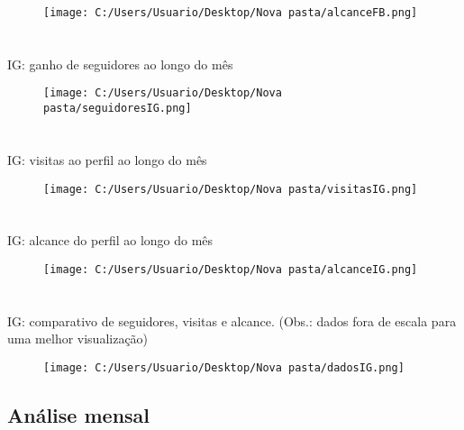 \documentclass{article}%
\begin{document}
\begin{figure}[H]%
\centering%
\texttt{[image: C:/Users/Usuario/Desktop/Nova pasta/alcanceFB.png]}%
\end{figure}

%
\section*{}%
\label{sec:}%
IG: ganho de seguidores ao longo do mês%


\begin{figure}[H]%
\centering%
\texttt{[image: C:/Users/Usuario/Desktop/Nova pasta/seguidoresIG.png]}%
\end{figure}

%
\section*{}%
\label{sec:}%
IG: visitas ao perfil ao longo do mês%


\begin{figure}[H]%
\centering%
\texttt{[image: C:/Users/Usuario/Desktop/Nova pasta/visitasIG.png]}%
\end{figure}

%
\section*{}%
\label{sec:}%
IG: alcance do perfil ao longo do mês%


\begin{figure}[H]%
\centering%
\texttt{[image: C:/Users/Usuario/Desktop/Nova pasta/alcanceIG.png]}%
\end{figure}

%
\newpage%
\section*{}%
\label{sec:}%
IG: comparativo de seguidores, visitas e alcance. (Obs.: dados fora de escala para uma melhor visualização)%


\begin{figure}[H]%
\centering%
\texttt{[image: C:/Users/Usuario/Desktop/Nova pasta/dadosIG.png]}%
\end{figure}

%
\newpage%
\subsection*{Análise mensal}%
\label{subsec:Anlisemensal}%
\end{document}
